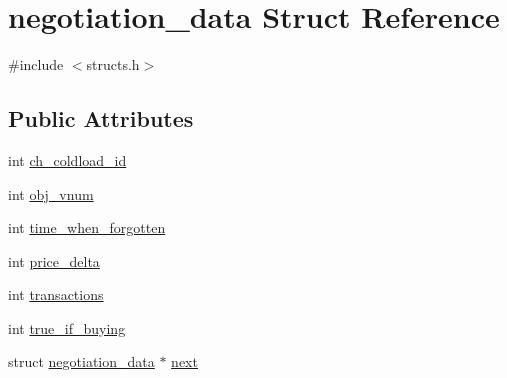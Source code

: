 \hypertarget{structnegotiation__data}{\section{negotiation\-\_\-data Struct Reference}
\label{structnegotiation__data}
}


{\ttfamily \#include $<$structs.\-h$>$}

\subsection*{Public Attributes}
\begin{DoxyCompactItemize}
\item 
int \hyperlink{structnegotiation__data_a6cb50dbb7c300cfce4c2dc344faf8aa9}{ch\-\_\-coldload\-\_\-id}
\item 
int \hyperlink{structnegotiation__data_ac2790f175dbb74ef8e3d5f2f116fe4c0}{obj\-\_\-vnum}
\item 
int \hyperlink{structnegotiation__data_a0deef4af9ec1998d699589a5fe108d82}{time\-\_\-when\-\_\-forgotten}
\item 
int \hyperlink{structnegotiation__data_a8f19b98b96a5b01517ef97903e1f9642}{price\-\_\-delta}
\item 
int \hyperlink{structnegotiation__data_af73b88881a030e61e4baca955d841fb8}{transactions}
\item 
int \hyperlink{structnegotiation__data_a53aae7f31645cb5fd8bcc86b5a54b00d}{true\-\_\-if\-\_\-buying}
\item 
struct \hyperlink{structnegotiation__data}{negotiation\-\_\-data} $\ast$ \hyperlink{structnegotiation__data_a63d08f24690474f04312e697f0275c22}{next}
\end{DoxyCompactItemize}



